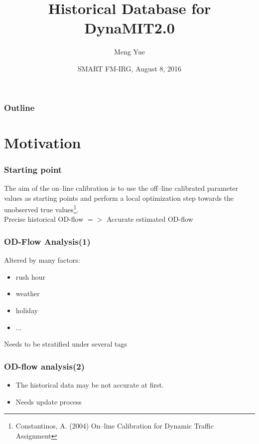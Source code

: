 \documentclass[12pt]{beamer}
\title[DynaMIT-Database Infrastructure]
{Historical Database for DynaMIT2.0}
\author{Meng Yue}
\institute[Dep.Automation,Tsinghua]
{Department of Automation,Tsinghua University, China}
\date[August 8, 2016]
{SMART FM-IRG, August 8, 2016}
\begin{document}
 

\frame{\titlepage}

\begin{frame}
\frametitle{Outline}
\tableofcontents
\end{frame}



\section{Motivation}

\begin{frame}
\frametitle{Starting point}
The aim of the on–line calibration is to use the off–line calibrated parameter
values as starting points and perform a local optimization step towards the unobserved true values\footnote{ Constantinos, A. (2004) On–line Calibration for Dynamic Traffic Assignment}.\\ 
\vspace{0.5in}
Precise historical OD-flow $=>$ Accurate estimated OD-flow \\

\end{frame}

\begin{frame}
\frametitle{OD-Flow Analysis(1)}
Altered by many factors:
\begin{itemize}
\item rush hour
\item weather
\item holiday
\item ...
\end{itemize}
\vspace{0.5in}
Needs to be stratified under several tags
\end{frame}

\begin{frame}
\frametitle{OD-flow analysis(2)}
\begin{itemize}
\item The historical data may be not accurate at first.\\
\vspace{0.5in}
\item Needs update process
\end{itemize}
\end{frame}
\end{document}
